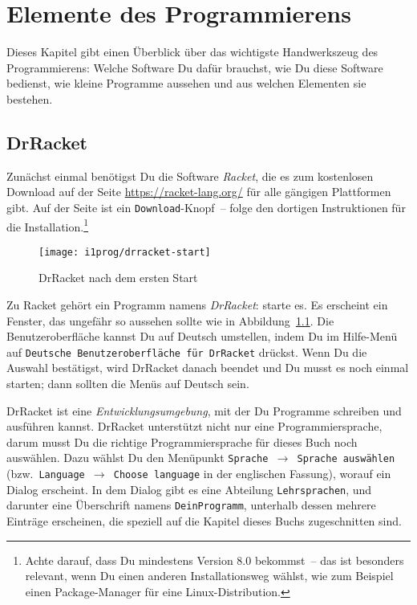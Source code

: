 
\chapter{Elemente des Programmierens}
\label{cha:whats-programming}

Dieses Kapitel gibt einen Überblick über das wichtigste Handwerkszeug
des Programmierens: Welche Software Du dafür brauchst, wie Du diese
Software bedienst, wie kleine Programme aussehen und aus welchen
Elementen sie bestehen.

\section{DrRacket}

Zunächst einmal benötigst Du die Software \textit{Racket}, die es zum
kostenlosen Download auf der Seite \url{https://racket-lang.org/} für
alle gängigen Plattformen gibt.  Auf der Seite ist ein
\texttt{Download}-Knopf~-- folge den dortigen Instruktionen für die
Installation.\footnote{Achte darauf, dass Du mindestens Version 8.0
bekommst~-- das ist besonders relevant, wenn Du einen anderen
Installationsweg wählst, wie zum Beispiel einen Package-Manager für
eine Linux-Distribution.}

\begin{figure}[tb]
  \centering
  \texttt{[image: i1prog/drracket-start]}
  \caption{DrRacket nach dem ersten Start}
  \label{fig:drracket-start}
\end{figure}

Zu Racket gehört ein Programm namens
\textit{DrRacket}: starte es.  Es erscheint ein
Fenster, das ungefähr so aussehen sollte wie in
Abbildung~\ref{fig:drracket-start}.  Die Benutzeroberfläche kannst
Du auf Deutsch umstellen, indem Du im Hilfe-Menü auf \texttt{Deutsche
  Benutzeroberfläche für DrRacket} drückst.  Wenn Du die Auswahl
bestätigst, wird DrRacket danach beendet und Du musst es noch einmal
starten; dann sollten die Menüs auf Deutsch sein.

DrRacket ist eine \textit{Entwicklungsumgebung}, mit der Du Programme
schreiben und ausführen kannst.  DrRacket unterstützt nicht nur eine
Programmiersprache, darum musst Du die richtige Programmiersprache für
dieses Buch noch auswählen.  Dazu wählst Du den Menüpunkt
\texttt{Sprache $\rightarrow$ Sprache auswählen} (bzw.\
\texttt{Language $\rightarrow$ Choose language} in der englischen
Fassung), worauf ein Dialog erscheint.  In dem Dialog gibt es eine
Abteilung \texttt{Lehrsprachen\index{Lehrsprachen}}, und darunter eine
Überschrift namens \texttt{DeinProgramm}, unterhalb dessen mehrere
Einträge erscheinen, die speziell auf die Kapitel dieses Buchs
zugeschnitten sind.

